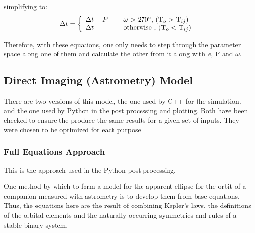\documentclass[12pt,preprint]{aastex}
\begin{document}
simplifying to:
\begin{equation}\label{eq:ToTcCorrections2b}
\Delta t = \left\{ \begin{array}{l l} \Delta t-P& \quad \text{ $\omega$ $>$ 270$^{\circ}$, (T$_o$ $>$ T$_{ij}$)}\\  \Delta t& \quad \text{ otherwise , (T$_o$ $<$ T$_{ij}$)} \end{array} \right.
\end{equation}

Therefore, with these equations, one only needs to step through the parameter space along one of them and calculate the other from it along with {\it e}, P and $\omega$.
\subsection{Direct Imaging (Astrometry) Model}\label{sec:DI-OrbModels}
There are two versions of this model, the one used by C++ for the simulation, and the one used by Python in the post processing and plotting.  Both have been checked to ensure the produce the same results for a given set of inputs.  They were chosen to be optimized for each purpose.

\subsubsection{Full Equations Approach}

This is the approach used in the Python post-processing.

One method by which to form a model for the apparent ellipse for the orbit of a companion measured with astrometry is to develop them from base equations.  Thus, the equations here are the result of combining Kepler's laws, the definitions of the orbital elements and the naturally occurring symmetries and rules of a stable binary system.\\
\end{document}
